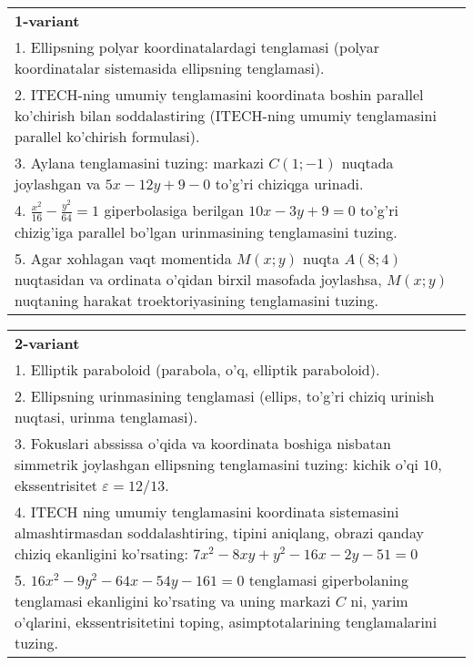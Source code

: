 \documentclass{article}
\begin{document}
\large
{}


\begin{tabular}{m{17cm}}
\textbf{1-variant}\\
1. Ellipsning polyar koordinatalardagi tenglamasi (polyar koordinatalar sistemasida ellipsning tenglamasi).\\

2. ITECH-ning umumiy tenglamasini koordinata boshin parallel ko'chirish bilan soddalastiring (ITECH-ning umumiy tenglamasini parallel ko'chirish formulasi).\\

3. Aylana tenglamasini tuzing: markazi $C(1;-1)$ nuqtada joylashgan va $5x-12y+9-0$ to'g'ri chiziqga urinadi.\\

4. $\frac{x^{2}}{16} - \frac{y^{2}}{64} = 1$ giperbolasiga berilgan $10x - 3y + 9 = 0$ to'g'ri chizig'iga parallel bo'lgan urinmasining tenglamasini tuzing.  \\

5. Agar xohlagan vaqt momentida $M(x;y)$ nuqta $A(8;4)$ nuqtasidan va ordinata o'qidan birxil masofada joylashsa, $M(x;y)$ nuqtaning harakat troektoriyasining tenglamasini tuzing.  
\end{tabular}
\vspace{1cm}


\begin{tabular}{m{17cm}}
\textbf{2-variant}\\
1. Elliptik paraboloid (parabola, o'q, elliptik paraboloid).\\

2. Ellipsning urinmasining tenglamasi (ellips, to'g'ri chiziq urinish nuqtasi, urinma tenglamasi).\\

3. Fokuslari abssissa o'qida va koordinata boshiga nisbatan simmetrik joylashgan ellipsning tenglamasini tuzing: kichik o'qi $10$, ekssentrisitet $\varepsilon=12/13$.\\

4. ITECH ning umumiy tenglamasini koordinata sistemasini almashtirmasdan soddalashtiring, tipini aniqlang, obrazi qanday chiziq ekanligini ko'rsating: $7x^{2} - 8xy + y^{2} - 16x - 2y - 51 = 0$\\

5. $16x^{2} - 9y^{2} - 64x - 54y - 161 = 0$ tenglamasi giperbolaning tenglamasi ekanligini ko'rsating va uning markazi $C$ ni, yarim o'qlarini, ekssentrisitetini toping, asimptotalarining tenglamalarini tuzing.  
\end{tabular}
\vspace{1cm}
\end{document}
